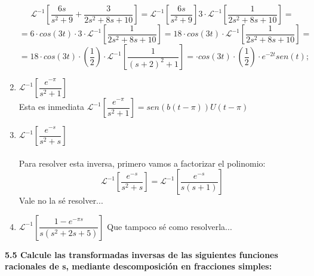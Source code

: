 \documentclass[11pt]{article}
\def\Laplace#1{\mathscr{L}}%
\begin{document}
\begin{enumerate}[(i.)]
\begin{center}
$$\Laplace[^{-1}\left[\dfrac{6s}{s^2+9}+
\dfrac{3}{2s^2+8s+10}\right]= \Laplace[^{-1}\left[\dfrac{6s}{s^2+9}\right] 3 
\cdot\Laplace[^{-1}\left[\dfrac{1}{2s^2+8s+10}\right]=$$
$$= 6\cdot cos(3t)\cdot 3 \cdot\Laplace[^{-1}\left[\dfrac{1}{2s^2+8s+10}\right]=18 \cdot cos(3t) \cdot \Laplace[^{-1}\left[\dfrac{1}{2s^2+8s+10}\right]=$$
$$=18 \cdot cos(3t) \cdot \left(\dfrac{1}{2} \right)\cdot \Laplace[^{-1}\left[\dfrac{1}{(s+2)^2+1}\right]=\cdot cos(3t) \cdot \left(\dfrac{1}{2} \right) \cdot e^{-2t}sen(t);$$
\end{center}
\item $\Laplace[^{-1}\left[\dfrac{e^{-\pi}}{s^2+1}\right]$
\\ Esta es inmediata
$\Laplace[^{-1}\left[\dfrac{e^{-\pi}}{s^2+1}\right]=sen(b(t-\pi))U(t-\pi)$
\item $\Laplace[^{-1}\left[\dfrac{e^{-s}}{s^2+s}\right]$
\\ \\ Para resolver esta inversa, primero vamos a factorizar el polinomio:
$$\Laplace[^{-1}\left[\dfrac{e^{-s}}{s^2+s}\right]=\Laplace[^{-1}\left[\dfrac{e^{-s}}{s(s+1)}\right]$$
Vale no la sé resolver...\\
\item $\Laplace[^{-1}\left[\dfrac{1-e^{-\pi s}}{s(s^2+2s+5)}\right]$
Que tampoco sé como resolverla...
\clearpage
\end{enumerate}
\textbf{5.5 Calcule las transformadas inversas de las siguientes funciones racionales de s, mediante descomposición en fracciones simples:}
\end{document}
